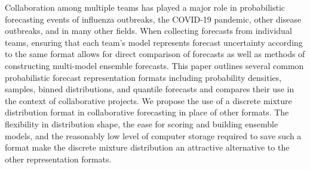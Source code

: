 
Collaboration among multiple teams has played a major role in probabilistic
forecasting events of influenza outbreaks, the COVID-19 pandemic, other disease
outbreaks, and in many other fields. When collecting forecasts from 
individual teams, ensuring that each team's model represents forecast
uncertainty according to the same format allows for direct comparison of 
forecasts as well as methods of constructing multi-model ensemble forecasts.
This paper outlines several common probabilistic forecast representation formats 
including
probability densities, samples, binned distributions, and  quantile 
forecasts and compares
their use in the context of collaborative projects. We propose the use of
a discrete mixture distribution format in collaborative forecasting in place of
other formats. The flexibility in distribution shape, the ease for scoring and 
building ensemble models, and the reasonably low level of computer storage 
required to save such a format make the discrete mixture distribution an 
attractive alternative to the other representation formats.

